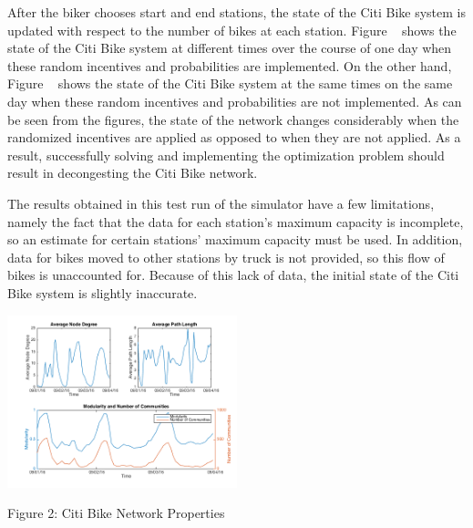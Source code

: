 \documentclass[times, 10pt,twocolumn]{article}
\begin{document}
After the biker chooses start and end stations, the state of the Citi Bike system is updated with respect to the number of bikes at each station. Figure ~ shows the state of the Citi Bike system at different times over the course of one day when these random incentives and probabilities are implemented. On the other hand, Figure ~ shows the state of the Citi Bike system at the same times on the same day when these random incentives and probabilities are not implemented. As can be seen from the figures, the state of the network changes considerably when the randomized incentives are applied as opposed to when they are not applied. As a result, successfully solving and implementing the optimization problem should result in decongesting the Citi Bike network.

The results obtained in this test run of the simulator have a few limitations, namely the fact that the data for each station's maximum capacity is incomplete, so an estimate for certain stations' maximum capacity must be used. In addition, data for bikes moved to other stations by truck is not provided, so this flow of bikes is unaccounted for. Because of this lack of data, the initial state of the Citi Bike system is slightly inaccurate.







\centerline{\includegraphics[width=0.5\textwidth]{m2/plotterfigure.png}}
\centerline{Figure 2: Citi Bike Network Properties}
\end{document}
